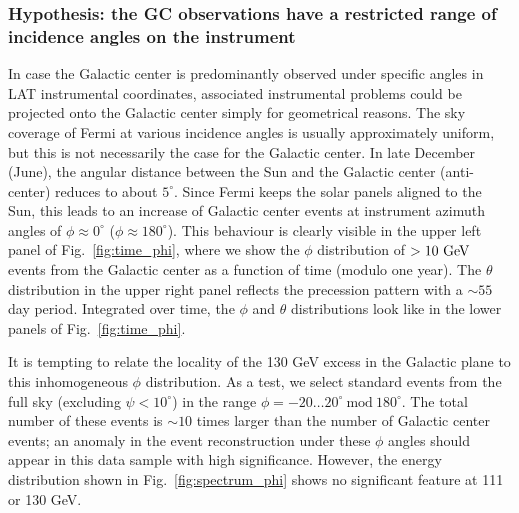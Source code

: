 \documentclass[aps,twocolumn,prd,superscriptaddress,showpacs,nofootinbib,fixfloat]{revtex4}
\newcommand{\GeV}{{\rm ~GeV}}
\begin{document}
\subsubsection{Hypothesis: the GC observations have a restricted range of
incidence angles on the instrument}

In case the Galactic center is predominantly observed under specific angles in
LAT instrumental coordinates, associated instrumental problems could be
projected onto the Galactic center simply for geometrical reasons. The sky
coverage of Fermi at various incidence angles is usually approximately
uniform, but this is not necessarily the case for the Galactic center.  In
late December (June), the angular distance between the Sun and the Galactic
center (anti-center) reduces to about $5^\circ$.  Since Fermi keeps the solar
panels aligned to the Sun, this leads to an increase of Galactic center events
at instrument azimuth angles of $\phi\approx 0^\circ$ ($\phi\approx
180^\circ$).  This behaviour is clearly visible in the upper left panel of
Fig.~\ref{fig:time_phi}, where we show the $\phi$ distribution of $>10\GeV$
events from the Galactic center as a function of time (modulo one year).  The
$\theta$ distribution in the upper right panel reflects the precession pattern
with a $\sim55$ day period. Integrated over time, the $\phi$ and $\theta$
distributions look like in the lower panels of Fig.~\ref{fig:time_phi}.

It is tempting to relate the locality of the 130 GeV excess in the Galactic
plane to this inhomogeneous $\phi$ distribution. As a test, we select standard
events from the full sky (excluding $\psi < 10^\circ$) in the range $\phi=
-20\dots20^\circ\ \text{mod}\ 180^\circ$. The total number of these events is
$\sim10$ times larger than the number of Galactic center events; an anomaly in
the event reconstruction under these $\phi$ angles should appear in this data
sample with high significance.  However, the energy distribution shown in
Fig.~\ref{fig:spectrum_phi} shows no significant feature at 111 or 130 GeV.
\end{document}
